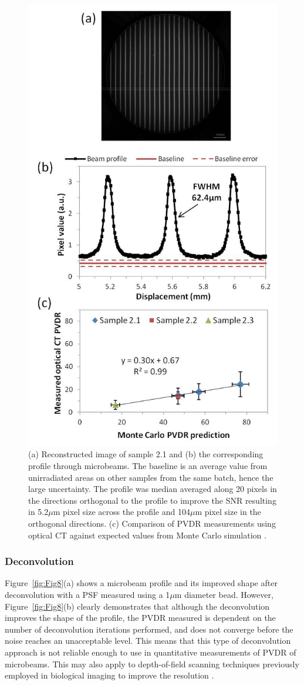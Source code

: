 \documentclass[12pt]{article}
\begin{document}
\begin{figure}
\centering
\includegraphics[width=0.6\linewidth]{Fig7}
\caption{(a) Reconstructed image of sample 2.1 and (b) the corresponding profile through microbeams. The baseline is an average value from unirradiated areas on other samples from the same batch, hence the large uncertainty. The profile was median averaged along 20 pixels in the directions orthogonal to the profile to improve the SNR resulting in 5.2$\mu$m pixel size across the profile and 104$\mu$m pixel size in the orthogonal directions. (c) Comparison of PVDR measurements using optical CT against expected values from Monte Carlo simulation \cite{martinez-roviradevelopment2012}.}
\label{fig:Fig7}
\end{figure}



\subsubsection{Deconvolution}
Figure~\ref{fig:Fig8}(a) shows a microbeam profile and its improved shape after deconvolution with a PSF measured using a 1$\mu$m diameter bead. However, Figure~\ref{fig:Fig8}(b) clearly demonstrates that although the deconvolution improves the shape of the profile, the PVDR measured is dependent on the number of deconvolution iterations performed, and does not converge before the noise reaches an unacceptable level. This means that this type of deconvolution approach is not reliable enough to use in quantitative measurements of PVDR of microbeams. This may also apply to depth-of-field scanning techniques previously employed in biological imaging to improve the resolution \cite{fauverthree-dimensional2005}. 
\end{document}
